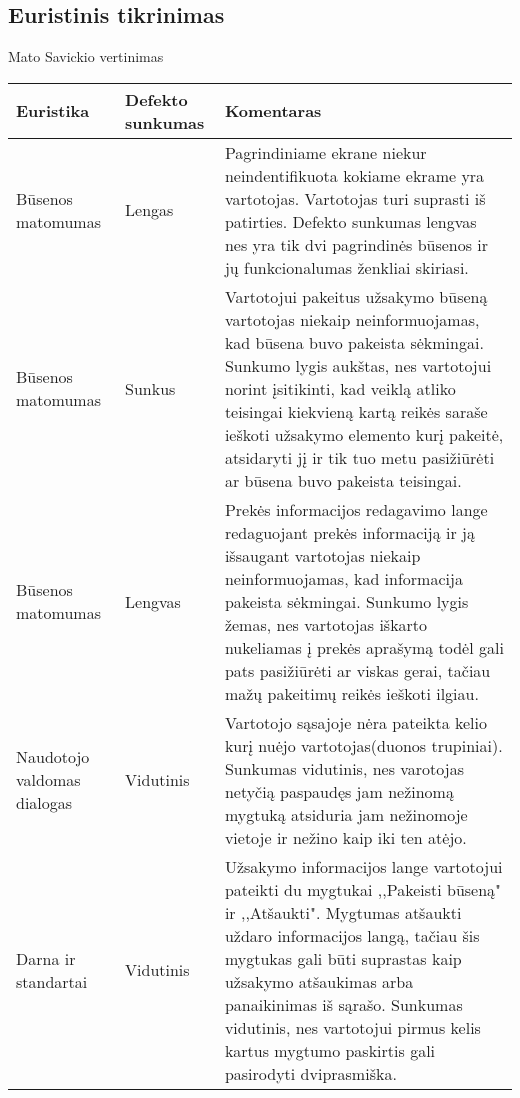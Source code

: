 \documentclass[oneside]{VUMIFPSkursinis}
\begin{document}
	\subsection{Euristinis tikrinimas}
Mato Savickio vertinimas
\begin{center}
    \begin{tabular}{ |p{3cm}| p{3cm} | p{11cm} | }
    \hline
	Euristika &Defekto sunkumas &Komentaras \\ \hline
	Būsenos matomumas & Lengas & Pagrindiniame ekrane niekur neindentifikuota kokiame ekrame yra vartotojas. 
						Vartotojas turi suprasti iš patirties. 
						Defekto sunkumas lengvas nes yra tik dvi pagrindinės būsenos ir jų funkcionalumas ženkliai skiriasi. \\ \hline
	Būsenos matomumas & Sunkus & Vartotojui pakeitus užsakymo būseną vartotojas niekaip neinformuojamas, kad būsena buvo pakeista sėkmingai.
						Sunkumo lygis aukštas, nes vartotojui norint įsitikinti, kad veiklą atliko teisingai kiekvieną kartą reikės saraše ieškoti užsakymo elemento kurį pakeitė, atsidaryti jį ir tik tuo metu pasižiūrėti ar būsena buvo pakeista teisingai. \\ \hline
	Būsenos matomumas & Lengvas & Prekės informacijos redagavimo lange redaguojant prekės informaciją ir ją išsaugant vartotojas niekaip neinformuojamas, kad informacija pakeista sėkmingai.
						Sunkumo lygis žemas, nes vartotojas iškarto nukeliamas į prekės aprašymą todėl gali pats pasižiūrėti ar viskas gerai, tačiau mažų pakeitimų reikės ieškoti ilgiau. \\ \hline
	Naudotojo valdomas dialogas & Vidutinis & Vartotojo sąsajoje nėra pateikta kelio kurį nuėjo vartotojas(duonos trupiniai). 
						Sunkumas vidutinis, nes varotojas netyčią paspaudęs jam nežinomą mygtuką atsiduria jam nežinomoje vietoje ir nežino kaip iki ten atėjo. \\ \hline
	Darna ir standartai & Vidutinis & Užsakymo informacijos lange vartotojui pateikti du mygtukai ,,Pakeisti būseną" ir ,,Atšaukti".
						Mygtumas atšaukti uždaro informacijos langą, tačiau šis mygtukas gali būti suprastas kaip užsakymo atšaukimas arba panaikinimas iš sąrašo. Sunkumas vidutinis, nes vartotojui pirmus kelis kartus mygtumo paskirtis gali pasirodyti dviprasmiška. \\ \hline

   \hline
    \end{tabular}
\end{center}
\end{document}
